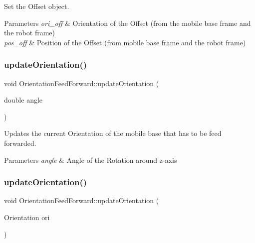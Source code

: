 Set the Offset object. 


\begin{DoxyParams}{Parameters}
{\em ori\+\_\+off} & Orientation of the Offset (from the mobile base frame and the robot frame) \\
\hline
{\em pos\+\_\+off} & Position of the Offset (from mobile base frame and the robot frame) \\
\hline
\end{DoxyParams}
\mbox{\label{classOrientationFeedForward_aa7d8913f8f9d90e913b478d9adc5ff20}} 
\subsubsection{\texorpdfstring{update\+Orientation()}{updateOrientation()}\hspace{0.1cm}{\footnotesize\ttfamily [1/2]}}
{\footnotesize\ttfamily void Orientation\+Feed\+Forward\+::update\+Orientation (\begin{DoxyParamCaption}\item[{double}]{angle }\end{DoxyParamCaption})}



Updates the current Orientation of the mobile base that has to be feed forwarded. 


\begin{DoxyParams}{Parameters}
{\em angle} & Angle of the Rotation around z-\/axis \\
\hline
\end{DoxyParams}
\mbox{\label{classOrientationFeedForward_aed8f826976135c0cd55408a652993828}} 
\subsubsection{\texorpdfstring{update\+Orientation()}{updateOrientation()}\hspace{0.1cm}{\footnotesize\ttfamily [2/2]}}
{\footnotesize\ttfamily void Orientation\+Feed\+Forward\+::update\+Orientation (\begin{DoxyParamCaption}\item[{Orientation}]{ori }\end{DoxyParamCaption})}



